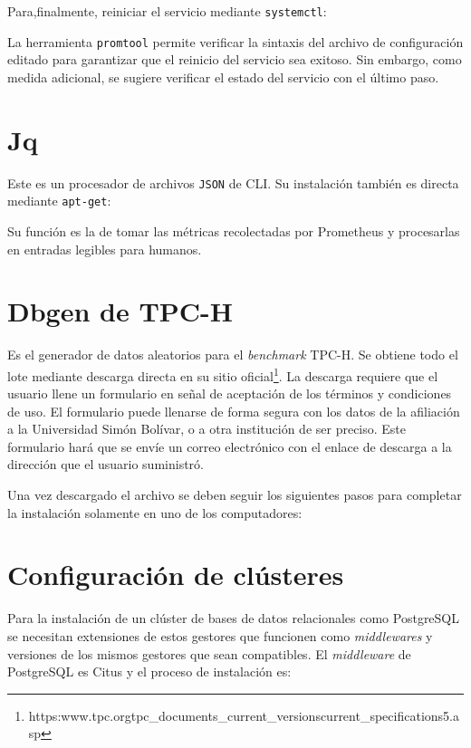 \documentclass[12pt, letter paper]{report}
\begin{document}
      Para,finalmente, reiniciar el servicio mediante \texttt{systemctl}:

      

      La herramienta \texttt{promtool} permite verificar la sintaxis del
      archivo de configuración editado para garantizar que el reinicio del
      servicio sea exitoso. Sin embargo, como medida adicional, se sugiere
      verificar el estado del servicio con el último paso.

    \section{Jq} %
    \label{sec:jq}
      Este es un procesador de archivos \texttt{JSON} de CLI. Su instalación
      también es directa mediante \texttt{apt-get}:

      

      Su función es la de tomar las métricas recolectadas por Prometheus y
      procesarlas en entradas legibles para humanos.

    \section{Dbgen de TPC-H} %
    \label{sec:dbgen_de_tpc_h}
      Es el generador de datos aleatorios para el \textit{benchmark} TPC-H.
      Se obtiene todo el lote mediante descarga directa en su sitio
      oficial\footnote[1]{https:\/\/www.tpc.org\/tpc\_documents\_current\_versions\/current\_specifications5.asp}.
      La descarga requiere que el usuario llene un formulario en señal de
      aceptación de los términos y condiciones de uso. El formulario puede
      llenarse de forma segura con los datos de la afiliación a la Universidad
      Simón Bolívar, o a otra institución de ser preciso. Este formulario hará
      que se envíe un correo electrónico con el enlace de descarga a la
      dirección que el usuario suministró.

      Una vez descargado el archivo se deben seguir los siguientes pasos
      para completar la instalación solamente en uno de los computadores:

      

    \section{Configuración de clústeres} %
    \label{sec:configuración_de_clústeres}
      Para la instalación de un clúster de bases de datos relacionales como
      PostgreSQL se necesitan extensiones de estos gestores que funcionen como
      \textit{middlewares} y versiones de los mismos gestores que sean
      compatibles. El \textit{middleware} de PostgreSQL es Citus y el proceso de
      instalación es:
\end{document}
